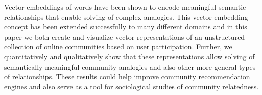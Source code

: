 Vector embeddings of words have been shown to encode meaningful semantic relationships that enable solving of complex analogies. This vector embedding concept has been extended successfully to many different domains and in this paper we both create and visualize vector representations of an unstructured collection of online communities based on user participation. Further, we quantitatively and qualitatively show that these representations allow solving of semantically meaningful community analogies and also other more general types of relationships. These results could help improve community recommendation engines and also serve as a tool for sociological studies of community relatedness.
